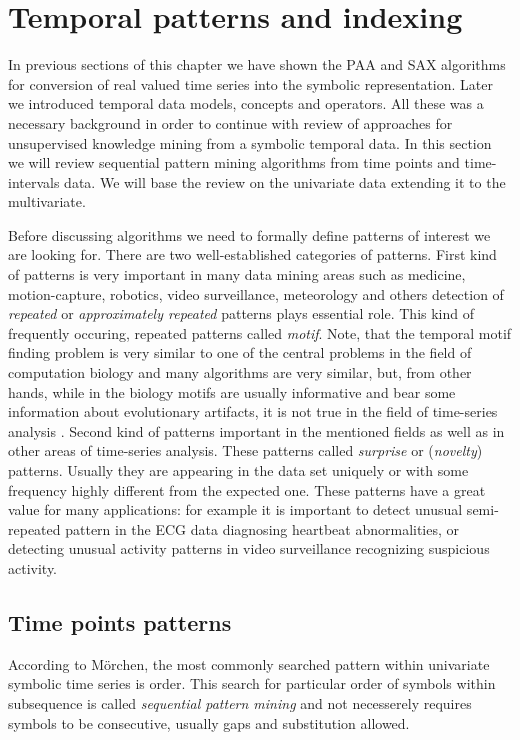 \section{Temporal patterns and indexing} \label{tpatterns}
In previous sections of this chapter we have shown the PAA and SAX algorithms for conversion of real valued time series into the symbolic representation. Later we introduced temporal data models, concepts and operators. All these was a necessary background in order to continue with review of approaches for unsupervised knowledge mining from a symbolic temporal data. In this section we will review sequential pattern mining algorithms from time points and time-intervals data. We will base the review on the univariate data extending it to the multivariate.

Before discussing algorithms we need to formally define patterns of interest we are looking for. There are two well-established categories of patterns. First kind of patterns is very important in many data mining areas such as medicine, motion-capture, robotics, video surveillance, meteorology and others detection of \textit{repeated} or \textit{approximately repeated} patterns plays essential role. This kind of frequently occuring, repeated patterns called \textit{motif}. Note, that the temporal motif finding problem is very similar to one of the central problems in the field of computation biology \cite{citeulike:465665} and many algorithms are very similar, but, from other hands, while in the biology motifs are usually informative and bear some information about evolutionary artifacts, it is not true in the field of time-series analysis \cite{citeulike:3978085}. Second kind of patterns important in the mentioned fields as well as in other areas of time-series analysis. These patterns called \textit{surprise} or (\textit{novelty}) patterns. Usually they are appearing in the data set uniquely or with some frequency highly different from the expected one. These patterns have a great value for many applications: for example it is important to detect unusual semi-repeated pattern in the ECG data diagnosing heartbeat abnormalities, or detecting unusual activity patterns in video surveillance recognizing suspicious activity.

\subsection{Time points patterns}
According to M\"orchen, the most commonly searched pattern within univariate symbolic time series is order. This search for particular order of symbols within subsequence is called \textit{sequential pattern mining} \cite{citeulike:775528} and not necesserely requires symbols to be consecutive, usually gaps and substitution allowed.

